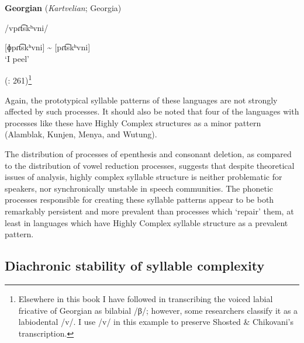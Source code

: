 \ea\label{ex:8.8}
  \textbf{Georgian} (\textit{Kartvelian}; Georgia)

/vpɾt͡skʰvni/

[ɸpɾt͡skʰvni] {\textasciitilde} [pɾt͡skʰvni]\\
\glt ‘I peel’

(\citealt{ShostedChikovani2006}: 261)\footnote{{Elsewhere in this book I have followed \citet{Aronson1991} in transcribing the voiced labial fricative of Georgian as bilabial /β/; however, some researchers classify it as a labiodental /v/. I use /v/ in this example to preserve Shosted \& Chikovani’s transcription.}}
\z

Again, the prototypical syllable patterns of these languages are not strongly affected by such processes. It should also be noted that four of the languages with processes like these have Highly Complex structures as a minor pattern (Alamblak, Kunjen, Menya, and Wutung).

  The distribution of processes of epenthesis and consonant deletion, as compared to the distribution of vowel reduction processes, suggests that despite theoretical issues of analysis, highly complex syllable structure is neither problematic for speakers, nor synchronically unstable in speech communities. The phonetic processes responsible for creating these syllable patterns appear to be both remarkably persistent and more prevalent than processes which ‘repair’ them, at least in languages which have Highly Complex syllable structure as a prevalent pattern.

\subsection{Diachronic stability of syllable complexity}\label{sec:8.5.2}

